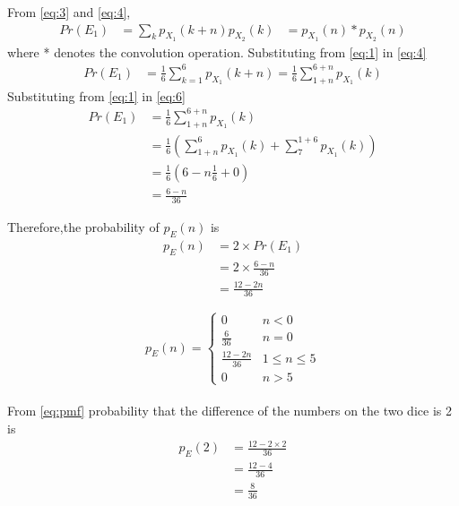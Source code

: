 \documentclass[journal,12pt,twocolumn]{IEEEtran}
\begin{document}
From \eqref{eq:3} and \eqref{eq:4},
\begin{align}
  Pr(E_1) &=\sum_{k}p_{X_{1}}(k+n)p_{X_{2}}(k)
  &= p_{X_{1}}(n)*p_{X_{2}}(n)\label{eq:5}
\end{align}
where * denotes the convolution operation. Substituting from \eqref{eq:1} in \eqref{eq:4}
\begin{align}
  Pr(E_1) &=\frac{1}{6}\sum_{k=1}^{6}p_{X_{1}}(k+n)=\frac{1}{6}\sum_{1+n}^{6+n}p_{X_{1}}(k)\label{eq:6}
\end{align}
Substituting from \eqref{eq:1} in \eqref{eq:6}
\begin{align}
  Pr(E_1) &=\frac{1}{6}\sum_{1+n}^{6+n}p_{X_{1}}(k)\nonumber\\
  &=\frac{1}{6}(\sum_{1+n}^{6}p_{X_{1}}(k)+\sum_{7}^{1+6}p_{X_{1}}(k))\nonumber\\
   &=\frac{1}{6}(6-n\frac{1}{6}+0)\nonumber\\
    &=\frac{6-n}{36}\nonumber
\end{align} 

Therefore,the probability of $p_E(n)$ is
\begin{align}
	p_E(n)&=2 \times Pr(E_1)\nonumber\\
	&=2 \times \frac{6-n}{36}\nonumber\\
	&=\frac{12-2n}{36}\nonumber
\end{align} 



\begin{equation}
p_{E}(n) =  
\begin{cases}
    0 &  n <  0  \\
    \frac{6}{36} & n=0\\
    \frac{12-2n}{36}& 1\leq  n\leq 5\\
    0 &  n>5
\end{cases}
\label{eq:pmf}
\end{equation}\\

From \eqref{eq:pmf} probability that the difference
of the numbers on the two dice is 2 is
\begin{align}
	p_E(2)&=\frac{12- 2 \times 2}{36}\nonumber\\
	&=\frac{12-4}{36}\nonumber\\
	&=\frac{8}{36}\nonumber
\end{align} 


%
\end{document}
